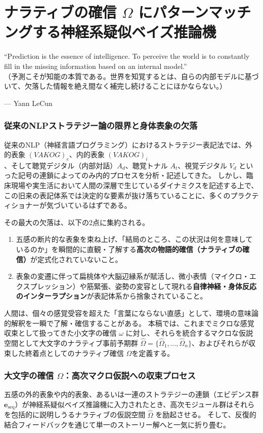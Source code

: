 \chapter{ナラティブの確信 $\Omega$ にパターンマッチングする神経系疑似ベイズ推論機}
\epigraph{``Prediction is the essence of intelligence. To perceive the world is to constantly fill in the missing information based on an internal model.''\\
\small（予測こそが知能の本質である。世界を知覚するとは、自らの内部モデルに基づいて、欠落した情報を絶え間なく補完し続けることにほかならない。）}{--- Yann LeCun}
\subsection{従来のNLPストラテジー論の限界と身体表象の欠落}
従来のNLP（神経言語プログラミング）におけるストラテジー表記法では、外的表象 $(VAKOG)_e$、内的表象 $(VAKOG)_i$、そして聴覚デジタル（内部対話）$A_d$、聴覚トナル $A_t$、視覚デジタル $V_d$ といった記号の連鎖によってのみ内的プロセスを分析・記述してきた。
しかし、臨床現場や実生活において人間の深層で生じているダイナミクスを記述する上で、この旧来の表記体系では決定的な要素が抜け落ちていることに、多くのプラクティショナーが気づいているはずである。

その最大の欠落は、以下の2点に集約される。
\begin{enumerate}[label=(\arabic*)]
  \item 五感の断片的な表象を束ね上げ、「結局のところ、この状況は何を意味しているのか」を瞬間的に直観・了解する\textbf{高次の物語的確信（ナラティブの確信）}が定式化されていないこと。
  \item 表象の変遷に伴って扁桃体や大脳辺縁系が賦活し、微小表情（マイクロ・エクスプレッション）や筋緊張、姿勢の変容として現れる\textbf{自律神経・身体反応のインターラプション}が表記体系から捨象されていること。
\end{enumerate}

人間は、個々の感覚受容を超えた「言葉にならない直感」として、環境の意味論的解釈を一瞬で了解・確信することがある。
本稿では、これまでミクロな感覚収束として扱ってきた小文字の確信 $\omega$ に対し、それらを統合するマクロな仮説空間として大文字のナラティブ事前予期群 $\hat{\Omega} = \{\hat{\Omega}_1, \dots, \hat{\Omega}_n\}$、およびそれらが収束した終着点としてのナラティブ確信 $\Omega$を定義する。

\subsection{大文字の確信 $\Omega$：高次マクロ仮説への収束プロセス}
五感の外的表象や内的表象、あるいは一連のストラテジーの連鎖（エビデンス群 $\boldsymbol{e}_{\mathrm{seq}}$）が神経系疑似ベイズ推論機に入力されたとき、高次モジュール群はそれらを包括的に説明しうるナラティブの仮説空間 $\hat{\Omega}$ を励起させる。
そして、反復的結合フィードバックを通じて単一のストーリー解へと一気に折り畳む。

